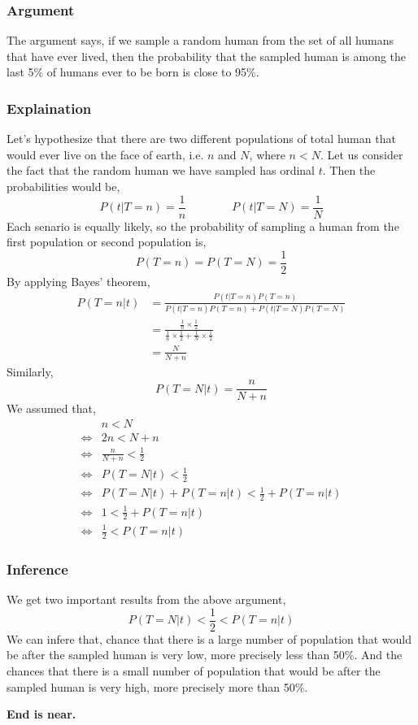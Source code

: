 \documentclass[
    10pt,
    aspectratio=169,
    xcolor={dvipsnames},
]{beamer}
\begin{document}
\begin{frame}
    \frametitle{Argument}
    The argument says, if we sample a random human from the set of all humans that have ever lived, then the probability that the sampled human is among the last 5\% of humans ever to be born is close to 95\%.
\end{frame}

\begin{frame}[allowframebreaks]
    \frametitle{Explaination}
    Let's hypothesize that there are two different populations of total human that would ever live on the face of earth, i.e. \(n\) and \(N\), where \(n<N\). Let us consider the fact that the random human we have sampled has ordinal \(t\). Then the probabilities would be,
    \[P(t|T=n)=\frac{1}{n}\qquad\qquad P(t|T=N)=\frac{1}{N}\]
    Each senario is equally likely, so the probability of sampling a human from the first population or second population is,
    \[P(T=n)=P(T=N)=\frac{1}{2}\]
    By applying Bayes' theorem,
    \begin{align}
        P(T=n|t) & =\frac{P(t|T=n)P(T=n)}{P(t|T=n)P(T=n)+P(t|T=N)P(T=N)}                                           \\
                 & =\frac{\frac{1}{n}\times\frac{1}{2}}{\frac{1}{n}\times\frac{1}{2}+\frac{1}{N}\times\frac{1}{2}} \\
                 & =\frac{N}{N+n}
    \end{align}
    Similarly,
    \[P(T=N|t)=\frac{n}{N+n}\]
    We assumed that,
    \begin{align}
             & n                   < N                      \\
        \iff & 2n             < N+n                         \\
        \iff & \frac{n}{N+n}  < \frac{1}{2}                 \\
        \iff & P(T=N|t)       < \frac{1}{2}                 \\
        \iff & P(T=N|t) + P(T=n|t) < \frac{1}{2} + P(T=n|t) \\
        \iff & 1 < \frac{1}{2} + P(T=n|t)                   \\
        \iff & \frac{1}{2} < P(T=n|t)
    \end{align}
\end{frame}

\begin{frame}
    \frametitle{Inference}
    We get two important results from the above argument,
    \[P(T=N|t) < \frac{1}{2} < P(T=n|t)\]
    We can infere that, chance that there is a large number of population that would be after the sampled human is very low, more precisely less than 50\%. And the chances that there is a small number of population that would be after the sampled human is very high, more precisely more than 50\%.

    \begin{center}
        \textbf{End is near.}
    \end{center}
\end{frame}
\end{document}
